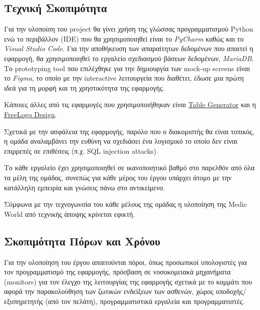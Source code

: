 \documentclass{article}
\begin{document}
\subsection{Τεχνική Σκοπιμότητα}

Για την υλοποίση του project θα γίνει χρήση της γλώσσας προγραμματισμού Python ενώ το περιβάλλον (IDE) που θα χρησιμοποιηθεί είναι το \emph{PyCharm} καθώς και το \emph{Visual Studio Code}. Για την αποθήκευση των απαραίτητων δεδομένων που απαιτεί η εφαρμογή, θα χρησιμοποιηθεί το εργαλείο σχεδιασμού βάσεων δεδομένων, \emph{MariaDB}. Το prototyping tool που επιλέχθηκε για την δημιουργία των mock-up screens 
είναι το \emph{Figma}, το οποίο με την interactive λειτουργεία που διαθέτει, έδωσε μια πρώτη ιδεά για τη μορφή και τη χρηστικότητα της εφαρμογής. \newline \par

Κάποιες άλλες από τις εφαρμογές που χρησιμοποιήθηκαν είναι \underline{\href{www.tablesgenerator.com}{Table Generator}} και η \underline{\href{www.freelogodesign.org}{FreeLogo Design}}. \newline\par
Σχετικά με την ασφάλεια της εφαρμογής, παρόλο που ο διακομιστής θα είναι τοπικός, η ομάδα αναλαμβάνει την ευθύνη να σχεδιάσει ένα λογισμικό το οποίο δεν είναι επιρρεπές σε επιθέσεις (π.χ. SQL injection attacks).
\newline \par
Το κάθε εργαλείο έχει χρησιμοποιηθεί σε ικανοποιητικό βαθμό στο παρελθόν από όλα τα μέλη της ομάδας, συνεπώς για κάθε μέρος του έργου υπάρχει άτομο με την κατάλληλη εμπειρία και γνώσεις πάνω στο αντικείμενο. 
\newline\par

Σύμφωνα με την τεχνογωνσία του κάθε μέλους της ομάδας η υλοποίηση της Medic World από τεχνικής άποψης κρίνεται εφικτή.

\subsection{Σκοπιμότητα Πόρων και Χρόνου}

Για την υλοποίηση του έργου απαιτούνται  πόροι, όπως προσωπικοί υπολογιστές για τον προγραμματισμό της εφαρμογής, πρόσβαση σε νοσοκομειακά μηχανήματα (monitors) για τον έλεγχο της λειτουργίας της εφαρμογής σχετικά με το κομμάτι που αφορά την παρακολούθηση των ζωτικών ενδείξεων των ασθενών, χώρος υποδοχής/εξυπηρετητής (από τον πελάτη), προγραμματιστικά εργαλεία και προγραμματιστές. \newline \par
\end{document}
